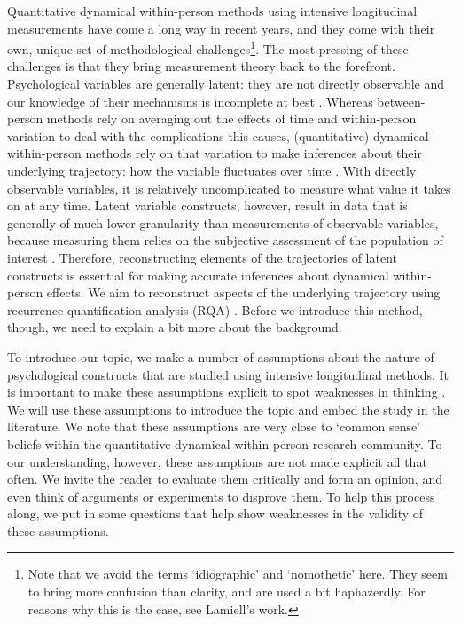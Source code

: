 \documentclass[utf8]{FrontiersinVancouver}
\begin{document}
Quantitative dynamical within-person methods using intensive longitudinal measurements have come a long way in recent years, and they come with their own, unique set of methodological challenges\footnote{Note that we avoid the terms `idiographic' and `nomothetic' here. They seem to bring more confusion than clarity, and are used a bit haphazerdly. For reasons why this is the case, see Lamiell's work\citep{lamiellNomotheticIdiographicContrasting1998}.}. The most pressing of these challenges is that they bring measurement theory back to the forefront. Psychological variables are generally latent: they are not directly observable and our knowledge of their mechanisms is incomplete at best \citep{bollenLatentVariablesPsychology2002}. Whereas between-person methods rely on averaging out the effects of time and within-person variation to deal with the complications this causes, (quantitative) dynamical within-person methods rely on that variation to make inferences about their underlying trajectory: how the variable fluctuates over time \citep{molenaarManifestoPsychologyIdiographic2004,molenaarNewPersonSpecificParadigm2009}. With directly observable variables, it is relatively uncomplicated to measure what value it takes on at any time. Latent variable constructs, however, result in data that is generally of much lower granularity than measurements of observable variables, because measuring them relies on the subjective assessment of the population of interest \citep{borsboomLatentVariableTheory2008}. Therefore, reconstructing elements of the trajectories of latent constructs is essential for making accurate inferences about dynamical within-person effects. We aim to reconstruct aspects of the underlying trajectory using recurrence quantification analysis (RQA) \citep{webber2005recurrence}. Before we introduce this method, though, we need to explain a bit more about the background.

To introduce our topic, we make a number of assumptions about the nature of psychological constructs that are studied using intensive longitudinal methods. It is important to make these assumptions explicit to spot weaknesses in thinking \citep{meehlTheoreticalRisksTabular2004}. We will use these assumptions to introduce the topic and embed the study in the literature. We note that these assumptions are very close to `common sense' beliefs within the quantitative dynamical within-person research community. To our understanding, however, these assumptions are not made explicit all that often. We invite the reader to evaluate them critically and form an opinion, and even think of arguments or experiments to disprove them. To help this process along, we put in some questions that help show weaknesses in the validity of these assumptions. 
\end{document}
